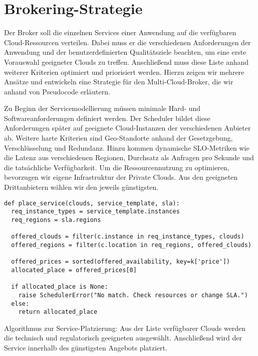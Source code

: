 \section{Brokering-Strategie}
\label{sec:brokering}

Der Broker soll die einzelnen Services einer Anwendung auf die verfügbaren Cloud-Ressourcen verteilen. Dabei muss er die verschiedenen Anforderungen der Anwendung und der benutzerdefinierten Qualitätsziele beachten, um eine erste Vorauswahl geeigneter Clouds zu treffen. Anschließend muss diese Liste anhand weiterer Kriterien optimiert und priorisiert werden. Hierzu zeigen wir mehrere Ansätze und entwickeln eine Strategie für den Multi-Cloud-Broker, die wir anhand von Pseudocode erläutern.

Zu Beginn der Servicemodellierung müssen minimale Hard- und Softwareanforderungen definiert werden. Der Scheduler bildet diese Anforderungen später auf geeignete Cloud-Instanzen der verschiedenen Anbieter ab. Weitere harte Kriterien sind Geo-Standorte anhand der Gesetzgebung, Verschlüsselung und Redundanz. Hinzu kommen dynamische SLO-Metriken wie die Latenz aus verschiedenen Regionen, Durchsatz als Anfragen pro Sekunde und die tatsächliche Verfügbarkeit. Um die Ressourcennutzung zu optimieren, bevorzugen wir eigene Infrastruktur der Private Clouds. Aus den geeigneten Drittanbietern wählen wir den jeweils günstigsten.

\begin{listing}[ht]
\begin{verbatim}
def place_service(clouds, service_template, sla):
  req_instance_types = service_template.instances
  req_regions = sla.regions
	
  offered_clouds = filter(c.instance in req_instance_types, clouds)
  offered_regions = filter(c.location in req_regions, offered_clouds)
	
  offered_prices = sorted(offered_availability, key=k['price'])
  allocated_place = offered_prices[0]
	
  if allocated_place is None:
    raise SchedulerError("No match. Check resources or change SLA.")
  else:
    return allocated_place
\end{verbatim}
\caption{Algorithmus zur Service-Platzierung: Aus der Liste verfügbarer Clouds werden die technisch und regulatorisch geeigneten ausgewählt. Anschließend wird der Service innerhalb des günstigsten Angebots platziert.}
\label{listing:placing}
\end{listing}

